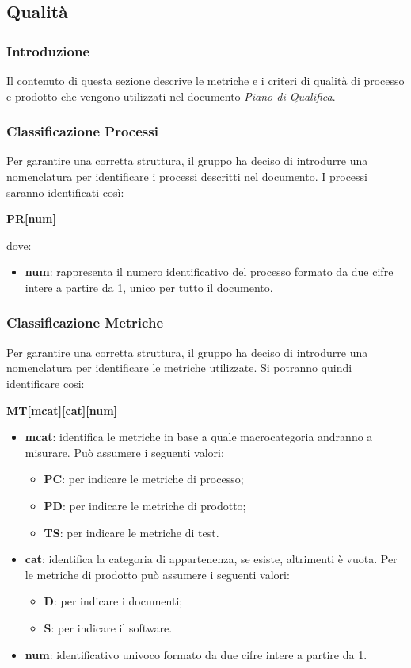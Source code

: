 \subsection{Qualità} \label{qualita}

\subsubsection{Introduzione}
Il contenuto di questa sezione descrive le metriche e i criteri di qualità di processo e prodotto che vengono utilizzati nel documento \textit{Piano di Qualifica}.

\subsubsection{Classificazione Processi}
Per garantire una corretta struttura, il gruppo ha deciso di introdurre una nomenclatura per identificare i processi descritti nel documento. I processi saranno identificati così:
\begin{center}
	\textbf{PR[num]}
\end{center}
dove:
\begin{itemize}
	\item \textbf{num}: rappresenta il numero identificativo del processo formato da due cifre intere a partire da 1, unico per tutto il documento.
\end{itemize}

\subsubsection{Classificazione Metriche}
Per garantire una corretta struttura, il gruppo ha deciso di introdurre una nomenclatura per identificare le metriche utilizzate. Si potranno quindi identificare cosi:
\begin{center}
	\textbf{MT[mcat][cat][num]}
\end{center}
\begin{itemize}
		\item \textbf{mcat}: identifica le metriche in base a quale macrocategoria andranno a misurare. Può assumere i seguenti valori:
	\begin{itemize}
		\item \textbf{PC}: per indicare le metriche di processo;
		\item \textbf{PD}: per indicare le metriche di prodotto;
		\item \textbf{TS}: per indicare le metriche di test.
	\end{itemize}
	\item \textbf{cat}: identifica la categoria di appartenenza, se esiste, altrimenti è vuota. Per le metriche di prodotto può assumere i seguenti valori:
	\begin{itemize}
		\item \textbf{D}: per indicare i documenti;
		\item \textbf{S}: per indicare il software.
	\end{itemize}

	\item \textbf{num}: identificativo univoco formato da due cifre intere a partire da 1.
\end{itemize}

